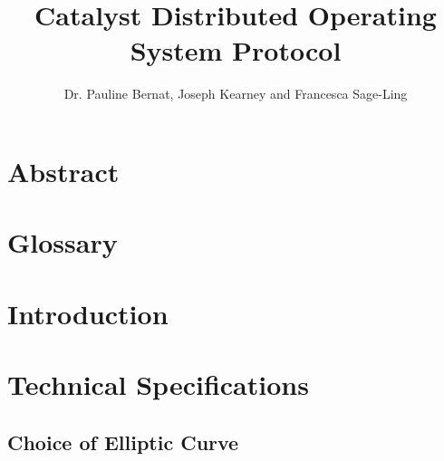 \documentclass[a4paper, 12pt]{book}
\begin{document}
\parindent=0in

\title{Catalyst Distributed Operating System Protocol}
\author{Dr. Pauline Bernat, Joseph Kearney and Francesca Sage-Ling}
\maketitle 

%

\chapter*{Abstract}


\tableofcontents


\chapter*{Glossary} \label{Cha:Glo}





\chapter*{Introduction} \label{Cha:Int}
 

 
 
\chapter{Technical Specifications} \label{Cha:Tec}



\section{Choice of Elliptic Curve}\label{Sec:EC}


\end{document}
